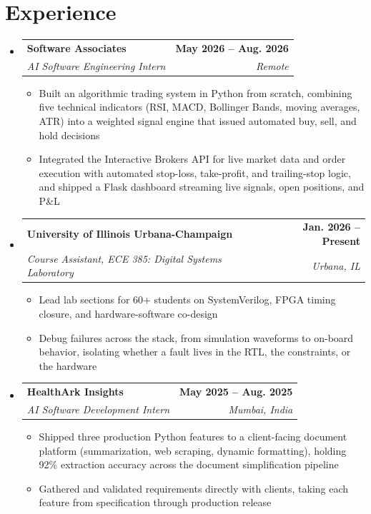 \documentclass[letterpaper,11pt]{article}
\makeatletter
\newcommand{\resumeItem}[1]{\item{\fontsize{9.5pt}{11.2pt}\selectfont #1\par}\vspace{-1pt}}
\newcommand{\resumeSubheading}[4]{
  \vspace{-2pt}\item
    \begin{tabular*}{\textwidth}[t]{l@{\extracolsep{\fill}}r}
      \textbf{#1} & \textbf{#2} \\
      \textit{\small#3} & \textit{\small #4} \\
    \end{tabular*}\vspace{-7pt}
}
\newcommand{\resumeSubHeadingListStart}{\begin{itemize}[leftmargin=0in, label={}]}
\newcommand{\resumeSubHeadingListEnd}{\end{itemize}}
\newcommand{\resumeItemListStart}{\begin{itemize}[leftmargin=0.32in, label=\textbullet, itemsep=0pt, topsep=2pt]}
\newcommand{\resumeItemListEnd}{\end{itemize}\vspace{-5pt}}
\makeatother
\begin{document}
\section{Experience}
  \resumeSubHeadingListStart
    \resumeSubheading
      {Software Associates}{May 2026 -- Aug. 2026}
      {AI Software Engineering Intern}{Remote}
      \resumeItemListStart
        \resumeItem{Built an algorithmic trading system in Python from scratch, combining five technical indicators (RSI, MACD, Bollinger Bands, moving averages, ATR) into a weighted signal engine that issued automated buy, sell, and hold decisions}
        \resumeItem{Integrated the Interactive Brokers API for live market data and order execution with automated stop-loss, take-profit, and trailing-stop logic, and shipped a Flask dashboard streaming live signals, open positions, and P\&L}
      \resumeItemListEnd
    \resumeSubheading
      {University of Illinois Urbana-Champaign}{Jan. 2026 -- Present}
      {Course Assistant, ECE 385: Digital Systems Laboratory}{Urbana, IL}
      \resumeItemListStart
        \resumeItem{Lead lab sections for 60+ students on SystemVerilog, FPGA timing closure, and hardware-software co-design}
        \resumeItem{Debug failures across the stack, from simulation waveforms to on-board behavior, isolating whether a fault lives in the RTL, the constraints, or the hardware}
      \resumeItemListEnd
    \resumeSubheading
      {HealthArk Insights}{May 2025 -- Aug. 2025}
      {AI Software Development Intern}{Mumbai, India}
      \resumeItemListStart
        \resumeItem{Shipped three production Python features to a client-facing document platform (summarization, web scraping, dynamic formatting), holding 92\% extraction accuracy across the document simplification pipeline}
        \resumeItem{Gathered and validated requirements directly with clients, taking each feature from specification through production release}
      \resumeItemListEnd
  \resumeSubHeadingListEnd

\end{document}

